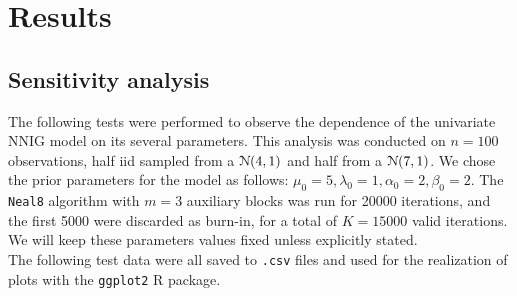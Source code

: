 
\chapter{Results}
\section{Sensitivity analysis}
The following tests were performed to observe the dependence of the univariate NNIG model on its several parameters.
This analysis was conducted on $n=100$ observations, half iid sampled from a $\mathcal N(4,1)$ and half from a $\mathcal N(7,1)$.
We chose the prior parameters for the model as follows: $\mu_0 = 5, \lambda_0 = 1, \alpha_0 = 2, \beta_0 = 2$.
The \verb|Neal8| algorithm with $m=3$ auxiliary blocks was run for 20000 iterations, and the first 5000 were discarded as burn-in, for a total of $K=15000$ valid iterations.
We will keep these parameters values fixed unless explicitly stated. \\
The following test data were all saved to \verb|.csv| files and used for the realization of plots with the \verb|ggplot2| R package.

